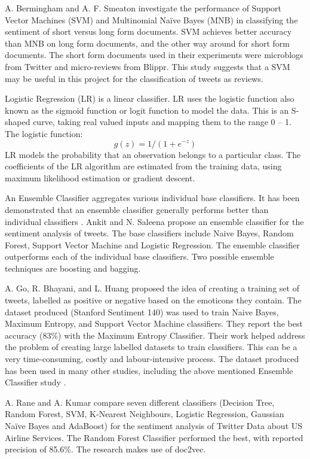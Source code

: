 A. Bermingham and A. F. Smeaton \cite{Berm2010} investigate the performance of Support Vector Machines (SVM) and Multinomial Naïve Bayes (MNB) in classifying the sentiment of short versus long form documents. SVM achieves better accuracy than MNB on long form documents, and the other way around for short form documents. The short form documents used in their experiments were microblogs from Twitter and micro-reviews from Blippr. This study suggests that a SVM may be useful in this project for the classification of tweets as reviews.

Logistic Regression (LR) is a linear classifier. LR uses the logistic function also known as the sigmoid function or logit function to model the data. This is an S-shaped curve, taking real valued inputs and mapping them to the range 0 – 1. The logistic function: \[g(z)=1/(1+e^{-z})\]
LR models the probability that an observation belongs to a particular class. The coefficients of the LR algorithm are estimated from the training data, using maximum likelihood estimation or gradient descent.

An Ensemble Classifier aggregates various individual base classifiers. It has been demonstrated that an ensemble classifier generally performs better than individual classifiers \cite{Opitz1999}. Ankit and N. Saleena \cite{Ankit2018} propose an ensemble classifier for the sentiment analysis of tweets. The base classifiers include Naive Bayes, Random Forest, Support Vector Machine and Logistic Regression. The ensemble classifier outperforms each of the individual base classifiers.
Two possible ensemble techniques are boosting and bagging.

A. Go, R. Bhayani, and L. Huang \cite{Go2009} proposed the  idea of creating a training set of tweets, labelled as positive or negative based on the emoticons they contain. The dataset produced (Stanford Sentiment 140) was used to train Naive Bayes, Maximum Entropy, and Support Vector Machine classifiers. They report the best accuracy (83\%) with the Maximum Entropy Classifier. Their work helped address the problem of creating large labelled datasets to train classifiers. This can be a very time-consuming, costly and labour-intensive process. The dataset produced has been used in many other studies, including the above mentioned Ensemble Classifier study \cite{Ankit2018}.

A. Rane and A. Kumar \cite{Rane2018} compare seven different classifiers (Decision Tree, Random Forest, SVM, K-Nearest Neighbours, Logistic Regression, Gaussian Naïve Bayes and AdaBoost) for the sentiment analysis of Twitter Data about US Airline Services. The Random Forest Classifier performed the best, with reported precision of 85.6\%. The research makes use of doc2vec.

